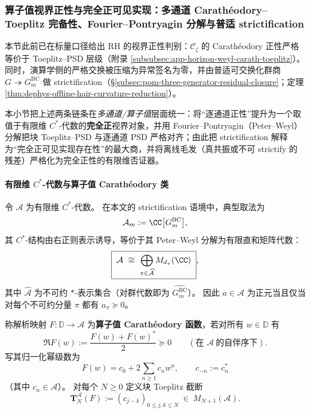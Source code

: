 \subsubsection{算子值视界正性与完全正可见实现：多通道 Carath\'eodory--Toeplitz 完备性、Fourier--Pontryagin 分解与普适 strictification}\label{subsubsec:xi-operator-valued-carath-toeplitz-complete-positivity}
本节此前已在标量口径给出 RH 的视界正性判别：\(\mathscr{C}_{\zeta}\) 的 Carath\'eodory 正性严格等价于 Toeplitz--PSD 层级（附录 \ref{subsubsec:app-horizon-weyl-carath-toeplitz}）。
同时，演算学侧的严格交换被压缩为异常签名为零，并由普适可交换化群商 \(G\twoheadrightarrow G^{\mathrm{BC}}_m\) 做 strictification（\S\ref{subsec:pom-three-generator-residual-closure}；定理 \ref{thm:dephys-offline-hair-curvature-reduction}）。
\par
本小节把上述两条链条在\emph{多通道/算子值}层面统一：将“逐通道正性”提升为一个取值于有限维 \(C^\ast\)-代数的\textbf{完全正}视界对象，并用 Fourier--Pontryagin（Peter--Weyl）分解把块 Toeplitz--PSD 与逐通道 PSD 严格对齐；由此把 strictification 解释为“完全正可见实现存在性”的最大商，并将离线毛发（真共振或不可 strictify 的残差）严格化为完全正性的有限维否证器。

\paragraph{有限维 \(C^\ast\)-代数与算子值 Carath\'eodory 类}
令 \(\mathcal{A}\) 为有限维 \(C^\ast\)-代数。
在本文的 strictification 语境中，典型取法为
\[
\mathcal{A}_m:=\CC\bigl[G^{\mathrm{BC}}_m\bigr],
\]
其 \(C^\ast\)-结构由右正则表示诱导，等价于其 Peter--Weyl 分解为有限直和矩阵代数：
\begin{equation}\label{eq:xi-A-peter-weyl}
\boxed{\;
\mathcal{A}
\ \cong\
\bigoplus_{\pi\in\widehat{\mathcal{A}}} M_{d_\pi}(\CC)\; },
\end{equation}
其中 \(\widehat{\mathcal{A}}\) 为不可约 \(\ast\)-表示集合（对群代数即为 \(\widehat{G^{\mathrm{BC}}_m}\)）。
因此 \(a\in\mathcal{A}\) 为正元当且仅当对每个不可约分量 \(\pi\) 都有 \(a_\pi\succeq 0\)。
\par
称解析映射 \(F:\mathbb{D}\to\mathcal{A}\) 为\textbf{算子值 Carath\'eodory 函数}，若对所有 \(w\in\mathbb{D}\) 有
\[
\Re F(w):=\frac{F(w)+F(w)^\ast}{2}\succeq 0
\qquad(\text{在 }\mathcal{A}\ \text{的自伴序下}).
\]
写其归一化幂级数为
\begin{equation}\label{eq:xi-operator-carath-series}
\boxed{\;
F(w)=c_0+2\sum_{n\ge 1}c_n w^n,\qquad c_{-n}:=c_n^\ast\;}
\end{equation}
（其中 \(c_n\in\mathcal{A}\)）。
对每个 \(N\ge 0\) 定义块 Toeplitz 截断
\begin{equation}\label{eq:xi-block-toeplitz-def}
\boxed{\;
\mathbf{T}^{\mathcal{A}}_N(F):=(c_{j-k})_{0\le j,k\le N}\ \in\ M_{N+1}(\mathcal{A}).\;}
\end{equation}

